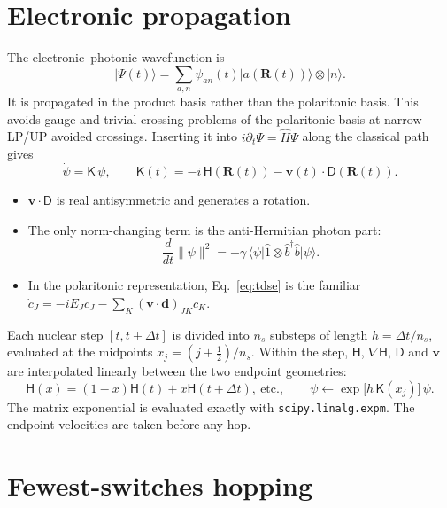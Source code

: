\documentclass[11pt]{article}
\newcommand{\ket}[1]{\lvert #1 \rangle}
\newcommand{\bra}[1]{\langle #1 \rvert}
\newcommand{\R}{\mathbf{R}}
\newcommand{\vv}{\mathbf{v}}
\newcommand{\grad}{\nabla}
\newcommand{\dd}{\mathbf{d}}
\newcommand{\bdag}{\hat b^{\dagger}}
\newcommand{\bop}{\hat b}
\newcommand{\Hm}{\mathsf{H}}
\newcommand{\Dm}{\mathsf{D}}
\newcommand{\code}[1]{\texttt{#1}}
\begin{document}
\section{Electronic propagation}
The electronic--photonic wavefunction is
\begin{equation}
\ket{\Psi(t)}=\sum_{a,n}\psi_{an}(t)\ket{a(\R(t))}\otimes\ket{n}.
\end{equation}
It is propagated in the product basis rather than the polaritonic basis. This avoids gauge and trivial-crossing problems of the polaritonic basis at narrow LP/UP avoided crossings. Inserting it into $i\partial_t\Psi=\hat H\Psi$ along the classical path gives
\begin{equation}
\dot\psi=\mathsf K\,\psi,\qquad \mathsf K(t)=-i\,\Hm(\R(t))-\vv(t)\cdot\Dm(\R(t)).
\label{eq:tdse}
\end{equation}
\begin{itemize}
\item $\vv\cdot\Dm$ is real antisymmetric and generates a rotation.
\item The only norm-changing term is the anti-Hermitian photon part:
\begin{equation}
\frac{d}{dt}\|\psi\|^2=-\gamma\,\bra\psi\hat 1\otimes\bdag\bop\ket\psi .
\end{equation}
\item In the polaritonic representation, Eq.~\eqref{eq:tdse} is the familiar $\dot c_J=-iE_Jc_J-\sum_K(\vv\cdot\dd)_{JK}c_K$.
\end{itemize}

Each nuclear step $[t,t+\Delta t]$ is divided into $n_s$ substeps of length $h=\Delta t/n_s$, evaluated at the midpoints $x_j=(j+\tfrac12)/n_s$. Within the step, $\Hm$, $\grad\Hm$, $\Dm$ and $\vv$ are interpolated linearly between the two endpoint geometries:
\begin{equation}
\Hm(x)=(1-x)\Hm(t)+x\Hm(t+\Delta t),\ \text{etc.},\qquad
\psi\leftarrow\exp\!\big[h\,\mathsf K(x_j)\big]\,\psi .
\end{equation}
The matrix exponential is evaluated exactly with \code{scipy.linalg.expm}. The endpoint velocities are taken before any hop.

\section{Fewest-switches hopping}
\end{document}

